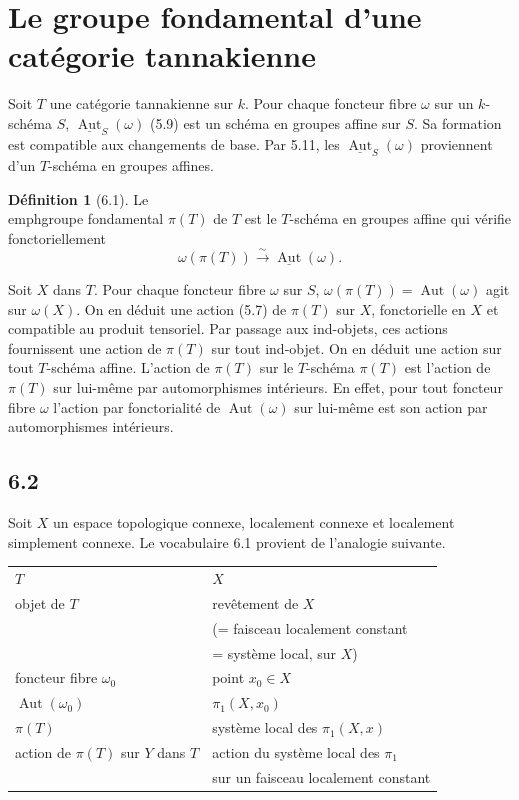 \documentclass[12pt,a4paper]{article}
\theoremstyle{plain}
\theoremstyle{definition}
\newtheorem{definition}[theorem]{D\'efinition}
\theoremstyle{remark}
\DeclareMathOperator{\Aut}{Aut}
\begin{document}
\section{Le groupe fondamental d'une catégorie tannakienne}
\label{sec:6}

Soit $T$ une catégorie tannakienne sur $k$. Pour chaque foncteur fibre $\omega$ sur un $k$-schéma $S$, $\underline{\Aut}_S(\omega)$ (5.9) est un schéma en groupes affine sur $S$. Sa formation est compatible aux changements de base. Par 5.11, les $\underline{\Aut}_S(\omega)$ proviennent d'un $T$-schéma en groupes affines.

\begin{definition}[6.1]\label{def:6.1}
Le \\emph{groupe fondamental} $\pi(T)$ de $T$ est le $T$-schéma en groupes affine qui vérifie fonctoriellement
\begin{equation*}\tag{6.1.1}
\omega(\pi(T)) 
\xrightarrow{\sim} 
\underline{\Aut}(\omega).
\end{equation*}
\end{definition}

Soit $X$ dans $T$. Pour chaque foncteur fibre $\omega$ sur $S$, $\omega(\pi(T)) = 
\Aut(\omega)$ agit sur $\omega(X)$. On en déduit une action (5.7) de $\pi(T)$ sur $X$, fonctorielle en $X$ et compatible au produit tensoriel. Par passage aux ind-objets, ces actions fournissent une action de $\pi(T)$ sur tout ind-objet. On en déduit une action sur tout $T$-schéma affine. L'action de $\pi(T)$ sur le $T$-schéma $\pi(T)$ est l'action de $\pi(T)$ sur lui-même par automorphismes intérieurs. En effet, pour tout foncteur fibre $\omega$ l'action par fonctorialité de $\Aut(\omega)$ sur lui-même est son action par automorphismes intérieurs.

\subsection*{6.2}
Soit $X$ un espace topologique connexe, localement connexe et localement simplement connexe. Le vocabulaire 6.1 provient de l'analogie suivante.

\begin{center}
\begin{tabular}{ll}
$T$ & $X$ \\
objet de $T$ & revêtement de $X$ \\
& (= faisceau localement constant \\
& = système local, sur $X$) \\
foncteur fibre $\omega_0$ & point $x_0 
\in X$ \\
$\Aut(\omega_0)$ & $\pi_1(X,x_0)$ \\
$\pi(T)$ & système local des $\pi_1(X,x)$ \\
action de $\pi(T)$ sur $Y$ dans $T$ & action du système local des $\pi_1$ \\
& sur un faisceau localement constant
\end{tabular}
\end{center}
\end{document}
